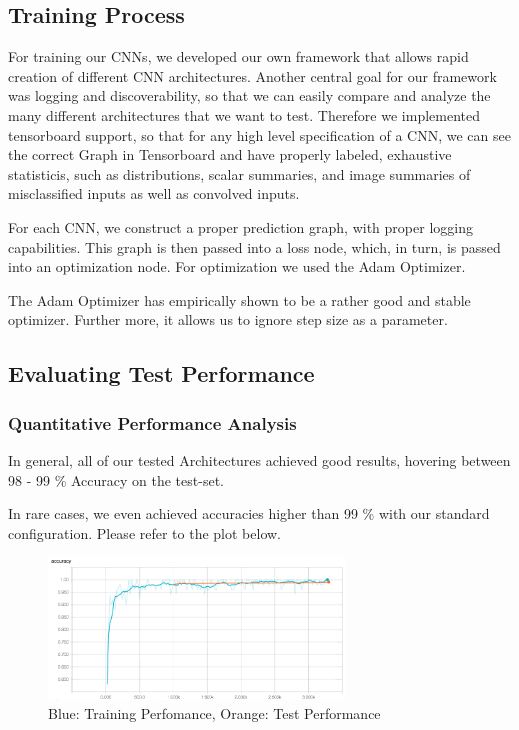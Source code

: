 \documentclass{article}
\begin{document}
\subsection{Training Process}

For training our CNNs, we developed our own framework that allows rapid creation of different CNN architectures. Another central goal for our framework was logging and discoverability, so that we can easily compare and analyze the many different architectures that we want to test. Therefore we implemented tensorboard support, so that for any high level specification of a CNN, we can see the correct Graph in Tensorboard and have properly labeled, exhaustive statisticis, such as distributions, scalar summaries, and image summaries of misclassified inputs as well as convolved inputs.

For each CNN, we construct a proper prediction graph, with proper logging capabilities. This graph is then passed into a loss node, which, in turn, is passed into an optimization node. For optimization we used the Adam Optimizer.

The Adam Optimizer has empirically shown to be a rather good and stable optimizer. Further more, it allows us to ignore step size as a parameter.

\subsection{Evaluating Test Performance}
\subsubsection{Quantitative Performance Analysis}

In general, all of our tested Architectures achieved good results, hovering between 98 - 99 \% Accuracy on the test-set.

In rare cases, we even achieved accuracies higher than 99 \% with our standard configuration. Please refer to the plot below.

\begin{figure}[h]
\centering
\includegraphics[width=0.7\textwidth]{imgs/accuracy_std.png}
\caption{Blue: Training Perfomance, Orange: Test Performance}
\end{figure}
\end{document}
